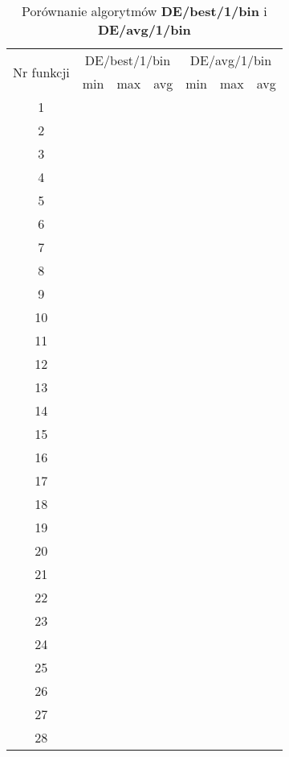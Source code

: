 \documentclass[a4paper,12pt]{article}
\theoremstyle{definition}
\begin{document}
\begin{table}[H]
\centering
\def\arraystretch{1.3}
\setlength\tabcolsep{10pt}
\caption{Porównanie algorytmów \textbf{DE/best/1/bin} i \textbf{DE/avg/1/bin}}
\vspace{8pt}
\begin{tabular}{|c|c|c|c|c|c|c|}
	
	\hline
	\multirow{2}{*}{Nr funkcji} & \multicolumn{3}{c|}{DE/best/1/bin} & \multicolumn{3}{c|}{DE/avg/1/bin}\\
	\cline{2-7}
	& min & max & avg & min & max & avg\\
	\hline
	1 &  &  &  &  &  &  \\
	\hline
	2 &  &  &  &  &  &  \\
	\hline
	3 &  &  &  &  &  &  \\
	\hline
	4 &  &  &  &  &  &  \\
	\hline
	5 &  &  &  &  &  &  \\
	\hline
	6 &  &  &  &  &  &  \\
	\hline
	7 &  &  &  &  &  &  \\
	\hline
	8 &  &  &  &  &  &  \\
	\hline
	9 &  &  &  &  &  &  \\
	\hline
	10 &  &  &  &  &  &  \\
	\hline
	11 &  &  &  &  &  &  \\
	\hline
	12 &  &  &  &  &  &  \\
	\hline
	13 &  &  &  &  &  &  \\
	\hline
	14 &  &  &  &  &  &  \\
	\hline
	15 &  &  &  &  &  &  \\
	\hline
	16 &  &  &  &  &  &  \\
	\hline
	17 &  &  &  &  &  &  \\
	\hline
	18 &  &  &  &  &  &  \\
	\hline
	19 &  &  &  &  &  &  \\
	\hline
	20 &  &  &  &  &  &  \\
	\hline
	21 &  &  &  &  &  &  \\
	\hline
	22 &  &  &  &  &  &  \\
	\hline
	23 &  &  &  &  &  &  \\
	\hline
	24 &  &  &  &  &  &  \\
	\hline
	25 &  &  &  &  &  &  \\
	\hline
	26 &  &  &  &  &  &  \\
	\hline
	27 &  &  &  &  &  &  \\
	\hline
	28 &  &  &  &  &  &  \\
	\hline
\end{tabular}	
\end{table}
\end{document}
